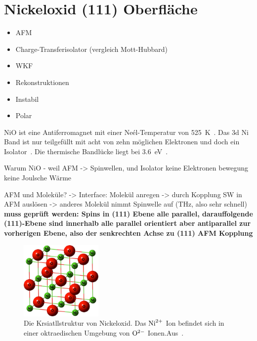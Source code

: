     \section{Nickeloxid (111) Oberfläche}
        \begin{itemize}
            \item AFM
            \item Charge-Transferisolator (vergleich Mott-Hubbard)
            \item WKF
            \item Rekonstruktionen
            \item Instabil
            \item Polar
        \end{itemize}
        NiO ist eine Antiferromagnet mit einer Neél-Temperatur von \SI{525}{\kelvin}~\cite{kunz_chemisorption_1985}.
        Das 3d Ni Band ist nur teilgefüllt mit acht von zehn möglichen Elektronen und doch ein Isolator~\cite{kunz_chemisorption_1985}.
        Die thermische Bandlücke liegt bei \SI{3.6}{\electronvolt}~\cite{kunz_chemisorption_1985}.

        Warum NiO - weil AFM -> Spinwellen, und Isolator keine Elektronen bewegung keine Joulsche Wärme

        AFM und Moleküle? -> Interface: Molekül anregen -> durch Kopplung SW in AFM auslösen -> anderes Molekül nimmt Spinwelle auf (THz, also sehr schnell)
        \textbf{muss geprüft werden: Spins in (111) Ebene alle parallel, darauffolgende (111)-Ebene sind innerhalb alle parallel orientiert aber antiparallel zur vorherigen Ebene, also der senkrechten Achse zu (111) AFM Kopplung}

        \begin{figure}
            \centering
            \includegraphics[width=4cm]{./content/NiO-structure}
            \caption{Die Krsiatllstruktur von Nickeloxid. Das $\ce{Ni}^{2+}$ Ion befindet sich in einer oktraedischen Umgebung von $\ce{O}^{2-}$ Ionen.Aus~\cite{NiO-structure}.}
            \label{fig:NiO-structure}
        \end{figure}

